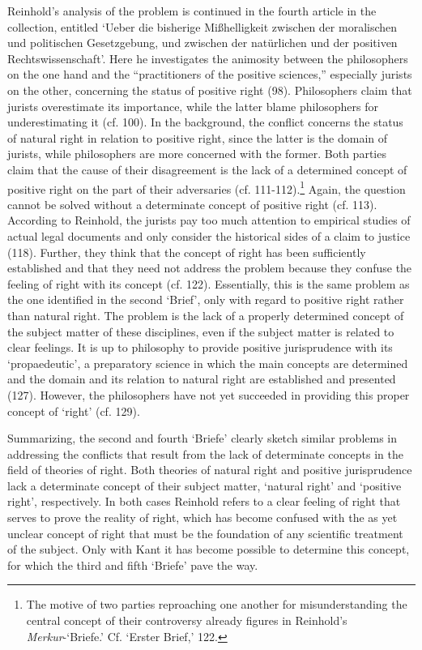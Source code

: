  Reinhold's analysis of the problem is continued in the fourth article in the collection, entitled `Ueber die bisherige Mi\ss{}helligkeit zwischen der moralischen und politischen Gesetzgebung, und zwischen der nat\"{u}rlichen und der positiven Rechtswissenschaft'. Here he investigates the animosity between the philosophers on the one hand and the ``practitioners of the positive sciences,'' especially jurists on the other, concerning the status of positive right (98). Philosophers claim that jurists overestimate its importance, while the latter blame philosophers for underestimating it (cf. 100). In the background, the conflict concerns the status of natural right in relation to positive right, since the latter is the domain of jurists, while philosophers are more concerned with the former. Both parties claim that the cause of their disagreement is the lack of a determined concept of positive right on the part of their adversaries (cf. 111{-}112).\footnote{ The motive of two parties reproaching one another for misunderstanding the central concept of their controversy already figures in Reinhold's \textit{Merkur}{-}`Briefe.' Cf. `Erster Brief,' 122. } Again, the question cannot be solved without a determinate concept of positive right (cf. 113). According to Reinhold, the jurists pay too much attention to empirical studies of actual legal documents and only consider the historical sides of a claim to justice (118). Further, they think that the concept of right has been sufficiently established and that they need not address the problem because they confuse the feeling of right with its concept (cf. 122). Essentially, this is the same problem as the one identified in the second `Brief', only with regard to positive right rather than natural right. The problem is the lack of a properly determined concept of the subject matter of these disciplines, even if the subject matter is related to clear feelings. It is up to philosophy to provide positive jurisprudence with its `propaedeutic', a preparatory science in which the main concepts are determined and the domain and its relation to natural right are established and presented (127). However, the philosophers have not yet succeeded in providing this proper concept of `right' (cf. 129). 

Summarizing, the second and fourth `Briefe' clearly sketch similar problems in addressing the conflicts that result from the lack of determinate concepts in the field of theories of right. Both theories of natural right and positive jurisprudence lack a determinate concept of their subject matter, `natural right' and `positive right', respectively. In both cases Reinhold refers to a clear feeling of right that serves to prove the reality of right, which has become confused with the as yet unclear concept of right that must be the foundation of any scientific treatment of the subject. Only with Kant it has become possible to determine this concept, for which the third and fifth `Briefe' pave the way. 

